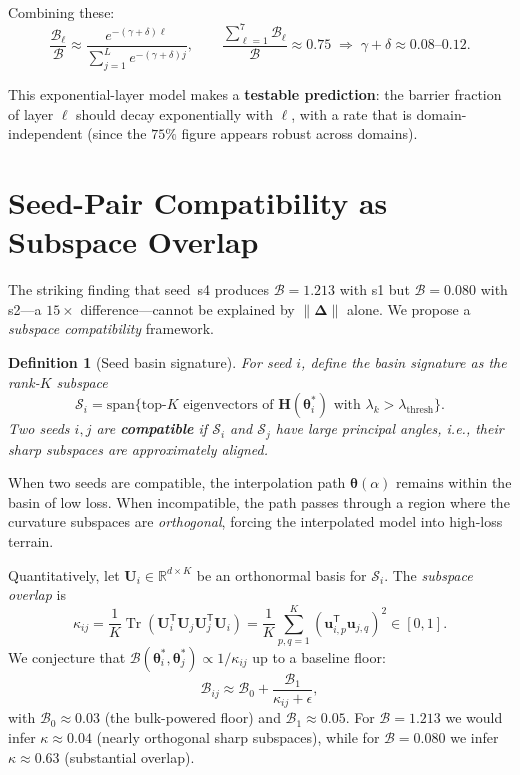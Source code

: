 \documentclass{article}
\newtheorem{definition}{Definition}
\DeclareMathOperator{\Tr}{Tr}
\newcommand{\R}{\mathbb{R}}
\newcommand{\Hess}{\mathbf{H}}
\newcommand{\btheta}{\bm{\theta}}
\newcommand{\bDelta}{\bm{\Delta}}
\begin{document}
Combining these:
\begin{equation}
\frac{\mathcal{B}_\ell}{\mathcal{B}} \approx
\frac{e^{-(\gamma+\delta)\ell}}{\sum_{j=1}^{L}e^{-(\gamma+\delta)j}},
\qquad
\frac{\sum_{\ell=1}^{7}\mathcal{B}_\ell}{\mathcal{B}} \approx 0.75
\;\Longrightarrow\; \gamma+\delta \approx 0.08\text{--}0.12.
\end{equation}

This exponential-layer model makes a \textbf{testable prediction}: the barrier fraction of
layer $\ell$ should decay exponentially with $\ell$, with a rate that is domain-independent
(since the $75\%$ figure appears robust across domains).

\section{Seed-Pair Compatibility as Subspace Overlap}

The striking finding that seed~s4 produces $\mathcal{B}=1.213$ with s1 but $\mathcal{B}=0.080$
with s2---a $15\times$ difference---cannot be explained by $\|\bDelta\|$ alone. We propose
a \emph{subspace compatibility} framework.

\begin{definition}[Seed basin signature]
For seed $i$, define the \emph{basin signature} as the rank-$K$ subspace
\begin{equation}
\mathcal{S}_i = \mathrm{span}\{\text{top-}K \text{ eigenvectors of }\Hess(\btheta^*_i)\text{ with }\lambda_k>\lambda_{\mathrm{thresh}}\}.
\end{equation}
Two seeds $i,j$ are \textbf{compatible} if $\mathcal{S}_i$ and $\mathcal{S}_j$ have large
principal angles, i.e., their sharp subspaces are approximately aligned.
\end{definition}

When two seeds are compatible, the interpolation path $\btheta(\alpha)$ remains within the
basin of low loss. When incompatible, the path passes through a region where the curvature
subspaces are \emph{orthogonal}, forcing the interpolated model into high-loss terrain.

Quantitatively, let $\mathbf{U}_i\in\R^{d\times K}$ be an orthonormal basis for $\mathcal{S}_i$.
The \emph{subspace overlap} is
\begin{equation}
\kappa_{ij} = \frac{1}{K}\Tr(\mathbf{U}_i^{\mathsf T}\mathbf{U}_j\mathbf{U}_j^{\mathsf T}\mathbf{U}_i)
= \frac{1}{K}\sum_{p,q=1}^K (\mathbf{u}_{i,p}^{\mathsf T}\mathbf{u}_{j,q})^2 \in [0,1].
\end{equation}
We conjecture that $\mathcal{B}(\btheta^*_i,\btheta^*_j) \propto 1/\kappa_{ij}$ up to
a baseline floor:
\begin{equation}
\boxed{\mathcal{B}_{ij} \approx \mathcal{B}_0 + \frac{\mathcal{B}_1}{\kappa_{ij}+\epsilon},}
\label{eq:compatibility}
\end{equation}
with $\mathcal{B}_0\approx0.03$ (the bulk-powered floor) and $\mathcal{B}_1\approx0.05$.
For $\mathcal{B}=1.213$ we would infer $\kappa\approx0.04$ (nearly orthogonal sharp subspaces),
while for $\mathcal{B}=0.080$ we infer $\kappa\approx0.63$ (substantial overlap).
\end{document}

